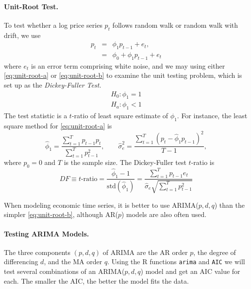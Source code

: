 \paragraph{Unit-Root Test.} To test whether a log price series $p_t$ follows random walk or random walk with drift, we use
\begin{subequations}
	\begin{eqnarray}
	p_t &=& \phi_1 p_{t-1} + e_t, \label{eq:unit-root-a} \\
	 &=& \phi_0 + \phi_1 p_{t-1} + e_t \label{eq:unit-root-b}
	\end{eqnarray}
\end{subequations}
where $e_t$ is an error term comprising white noise, and we may using either \eqref{eq:unit-root-a} or \eqref{eq:unit-root-b} to examine the unit testing problem, which is set up as the \emph{Dickey-Fuller Test.}\\
\begin{eqnarray*}
H_0: \phi_1 = 1 \\
H_a: \phi_1 < 1
\end{eqnarray*}
The test statistic is a $t$-ratio of least square estimate of $\phi_1$. For instance, the least square method for \eqref{eq:unit-root-a} is
\[
\hat{\phi}_1 = \frac{\sum^T_{t=1}p_{t-1}p_t}{\sum^T_{t=1}p^2_{t-1}}, \qquad
\hat{\sigma}^2_e = \frac{\sum^T_{t=1}(p_t-\hat{\phi}_1 p_{t-1})^2}{T-1},
\]
where $p_0=0$ and $T$ is the sample size. The Dickey-Fuller test $t$-ratio is
\[
DF \equiv \text{$t$-ratio} = \frac{\hat{\phi}_1-1}{\text{std}(\hat{\phi}_1)} 
= \frac{\sum^T_{t=1}p_{t-1}e_t}{\hat{\sigma}_e \sqrt{\sum^T_{t=1}p^2_{t-1}}}
\]

When modeling economic time series, it is better to use ARIMA($p,d,q$) than the simpler \eqref{eq:unit-root-b}, although AR($p$) models are also often used.

\paragraph{Testing ARIMA Models.} The three components $(p,d,q)$ of ARIMA are the AR order $p$, the degree of differencing $d$, and the MA order $q$. Using the R functions \texttt{arima} and \texttt{AIC} we will test several combinations of an ARIMA($p,d,q$) model and get an AIC value for each. The smaller the AIC, the better the model fits the data.

